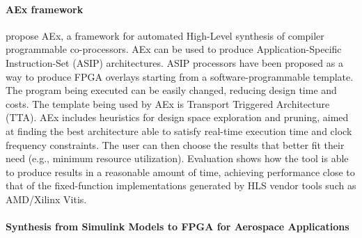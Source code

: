 \paragraph{AEx framework} 


\citet{Hirvonen2023AEx:Co-Processors} propose %
AEx, a framework for automated High-Level synthesis of compiler programmable co-processors. AEx can be used to produce Application-Specific Instruction-Set (ASIP) architectures. ASIP processors have been proposed as a way to produce FPGA overlays starting from a software-programmable template. The program being executed can be easily changed, reducing design time and costs. The template being used by AEx is Transport Triggered Architecture (TTA).
AEx includes heuristics for design space exploration and pruning, aimed at finding the best architecture able to satisfy real-time execution time and clock frequency constraints. The user can then choose the results that better fit their need (e.g., minimum resource utilization). Evaluation %
shows how the tool is able to produce results in a reasonable amount of time, achieving %
performance close to that of the fixed-function implementations generated by HLS vendor tools such as AMD/Xilinx Vitis.



\paragraph{Synthesis from Simulink Models to FPGA for Aerospace Applications}


